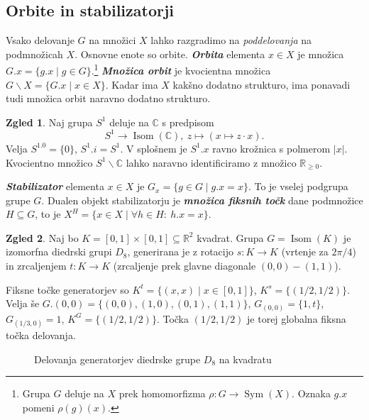 \documentclass[11pt]{book}
\def\RR{\mathbb{R}}
\def\CC{\mathbb{C}}
\DeclareMathOperator\Sym{Sym}
\DeclareMathOperator\Isom{Isom}
\def\definicija{\color{rdeca}\bf\em}
\theoremstyle{definition}
\theoremstyle{zgled}
\newtheorem*{zgled}{Zgled}
\theoremstyle{odprtproblem}
\theoremstyle{domacanaloga}
\theoremstyle{izrek}
\begin{document}
\subsection{Orbite in stabilizatorji}

Vsako delovanje $G$ na množici $X$ lahko razgradimo na {\em poddelovanja} na podmnožicah $X$. Osnovne enote so orbite. {\definicija Orbita} elementa $x \in X$ je množica $G.x = \{ g.x \mid g \in G \}$.\footnote{Grupa $G$ deluje na $X$ prek homomorfizma $\rho \colon G \to \Sym(X)$. Oznaka $g.x$ pomeni $\rho(g)(x)$.} {\definicija Množica orbit} je kvocientna množica $G \backslash X = \{ G.x \mid x \in X \}$. Kadar ima $X$ kakšno dodatno strukturo, ima ponavadi tudi množica orbit naravno dodatno strukturo.

\begin{zgled}
Naj grupa $S^1$ deluje na $\CC$ s predpisom
\[
S^1 \to \Isom(\CC), \ z \mapsto (x \mapsto z \cdot x).
\]
Velja $S^1.0 = \{ 0 \}$, $S^1.i = S^1$. V splošnem je $S^1.x$ ravno krožnica s polmerom $|x|$. Kvocientno množico $S^1 \backslash \CC$ lahko naravno identificiramo z množico $\RR_{\geq 0}$.
\end{zgled}

{\definicija Stabilizator} elementa $x \in X$ je $G_x = \{ g \in G \mid g.x = x \}$. To je vselej podgrupa grupe $G$. Dualen objekt stabilizatorju je {\definicija množica fiksnih točk} dane podmnožice $H \subseteq G$, to je $X^H = \{ x \in X \mid \forall h \in H \colon \ h.x = x \}$.

\begin{zgled}
Naj bo $K = [0,1] \times [0,1] \subseteq \RR^2$ kvadrat. Grupa $G = \Isom(K)$ je izomorfna diedrski grupi $D_8$, generirana je z rotacijo $s \colon K \to K$ (vrtenje za $2\pi/4$) in zrcaljenjem $t \colon K \to K$ (zrcaljenje prek glavne diagonale $(0,0)-(1,1)$).

Fiksne točke generatorjev so $K^t = \{ (x,x) \mid x \in [0,1] \}$, $K^s = \{ (1/2, 1/2 )\}$. Velja še $G.(0,0) = \{ (0,0), (1,0), (0,1) , (1,1) \}$, $G_{(0,0)} = \{ 1, t \}$, $G_{(1/3, 0)} = 1$, $K^G = \{ (1/2, 1/2) \}$. Točka $(1/2, 1/2)$ je torej globalna fiksna točka delovanja.
\end{zgled}

\begin{figure}[t]
\centering
{}
\caption{Delovanja generatorjev diedrske grupe $D_8$ na kvadratu}
\end{figure}
\end{document}
